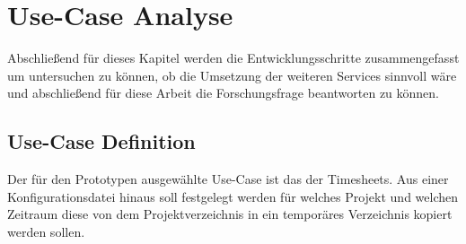 \section{Use-Case Analyse}

Abschließend für dieses Kapitel werden die Entwicklungsschritte zusammengefasst um untersuchen zu können, ob die Umsetzung der weiteren Services sinnvoll wäre und abschließend für diese Arbeit die Forschungsfrage beantworten zu können.

\subsection{Use-Case Definition}
Der für den Prototypen ausgewählte Use-Case ist das \grqq der Timesheets. Aus einer Konfigurationsdatei hinaus soll festgelegt werden für welches Projekt und welchen Zeitraum diese von dem Projektverzeichnis in ein temporäres Verzeichnis kopiert werden sollen. %
